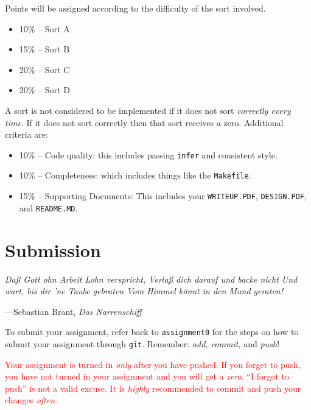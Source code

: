 \documentclass{article}
\begin{document}
\begin{enumerate}
\begin{itemize}
\end{itemize}
\end{enumerate}

\noindent Points will be assigned according to the difficulty of the sort involved.
\begin{itemize}
\item 10\% -- Sort A%
\item 15\% -- Sort B%
\item 20\% -- Sort C%
\item 20\% -- Sort D%
\end{itemize}

A sort is not considered to be implemented if it does not sort \emph{correctly
every time}. If it does not sort correctly then that sort receives a zero. Additional criteria are:
\begin{itemize}
\item 10\% -- Code quality: this includes passing \texttt{infer} and consistent style.
\item 10\% -- Completeness: which includes things like the \texttt{Makefile}.
\item 15\% -- Supporting Documents: This includes your \texttt{WRITEUP.PDF}, \texttt{DESIGN.PDF}, and \texttt{README.MD}.
\end{itemize}


\section{Submission}
\epigraph{\emph{Da\ss{} Gott ohn Arbeit Lohn verspricht,
Verla\ss{} dich darauf und backe nicht
Und wart, bis dir 'ne Taube gebraten
Vom Himmel k\"onnt in den Mund geraten!}}{---Sebastian Brant, \emph{Das Narrenschiff}}

To submit your assignment, refer back to \texttt{assignment0} for
the steps on how to submit your assignment through \texttt{git}.
Remember: \emph{add, commit,} and \emph{push}!

\textcolor{red}{Your assignment is turned in \emph{only} after you have pushed.
If you forget to push, you have not turned in your assignment and you will get
a \emph{zero}. ``I forgot to push'' is not a valid excuse. It is \emph{highly} recommended to commit and push your changes \emph{often}.}
\end{document}
